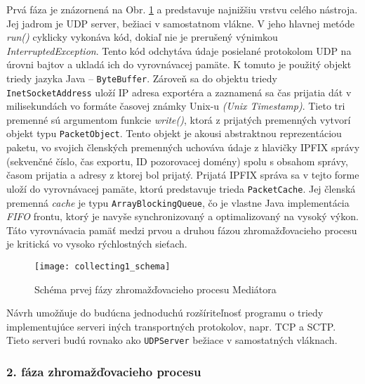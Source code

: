 Prvá fáza je znázornená na Obr. \ref{o:collecting1_schema} a predstavuje najnižšiu vrstvu celého 
nástroja. Jej jadrom je UDP server, bežiaci v samostatnom vlákne. V jeho hlavnej metóde \emph{run()}
cyklicky vykonáva kód, dokiaľ nie je prerušený výnimkou \emph{InterruptedException}.
Tento kód odchytáva údaje posielané protokolom UDP na úrovni bajtov a ukladá ich do 
vyrovnávacej pamäte. K tomuto je použitý objekt triedy jazyka Java -- \verb|ByteBuffer|. Zároveň sa do 
objektu triedy \verb|InetSocketAddress| uloží IP adresa exportéra a zaznamená sa čas prijatia dát v 
milisekundách vo formáte časovej známky Unix-u \emph{(Unix Timestamp)}. Tieto tri premenné sú argumentom 
funkcie \emph{write()}, 
ktorá z prijatých premenných vytvorí objekt typu \verb|PacketObject|. Tento objekt je akousi
abstraktnou reprezentáciou paketu, vo svojich členských premenných uchováva údaje z hlavičky
IPFIX správy (sekvenčné číslo, čas exportu, ID pozorovacej domény) spolu s obsahom správy, časom 
prijatia a adresy z ktorej bol prijatý. Prijatá IPFIX správa sa v tejto forme uloží do vyrovnávacej 
pamäte, ktorú predstavuje trieda \verb|PacketCache|. Jej členská 
premenná \emph{cache} je typu \verb|ArrayBlockingQueue|, čo je vlastne Java implementácia \emph{FIFO}
frontu, ktorý je navyše synchronizovaný a optimalizovaný na vysoký výkon. Táto vyrovnávacia pamäť 
medzi prvou a druhou fázou zhromažďovacieho procesu je kritická vo vysoko rýchlostných sieťach. 

\begin{figure}[ht!]
\centering
\texttt{[image: collecting1\_schema]}
\caption{Schéma prvej fázy zhromažďovacieho procesu Mediátora}\label{o:collecting1_schema}
\end{figure}

Návrh umožňuje do budúcna jednoduchú rozšíriteľnosť programu o triedy implementujúce serveri iných transportných 
protokolov, napr. TCP a SCTP. Tieto serveri budú rovnako ako \verb|UDPServer| bežiace v samostatných 
vláknach.

\subsubsection{2. fáza zhromažďovacieho procesu}

